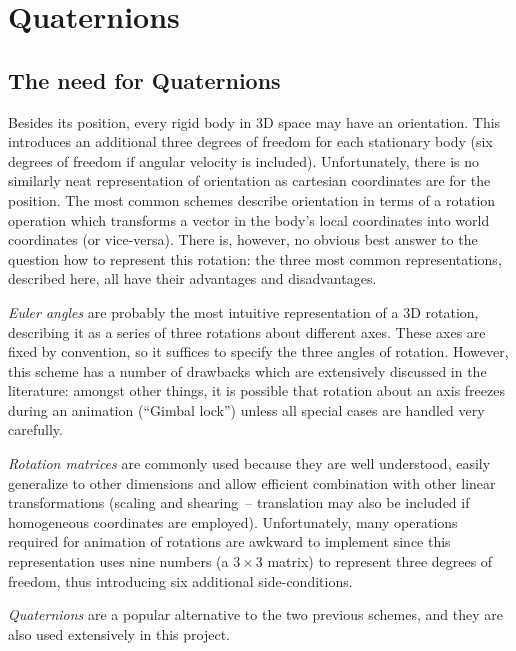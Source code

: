 \section{Quaternions}
\subsection{The need for Quaternions}
Besides its position, every rigid body in 3D space may have an orientation. This introduces an
additional three degrees of freedom for each stationary body (six degrees of freedom if
angular velocity is included). Unfortunately, there is no similarly neat representation of
orientation as cartesian coordinates are for the position. The most common schemes describe
orientation in terms of a rotation operation which transforms a vector in the body's local
coordinates into world coordinates (or vice-versa). There is, however, no obvious best
answer to the question how to represent this rotation: the three most common representations,
described here, all have their advantages and disadvantages.

{\em Euler angles} are probably the most intuitive representation of a 3D rotation, describing
it as a series of three rotations about different axes. These axes are fixed by convention, so it
suffices to specify the three angles of rotation. However, this scheme has a number of drawbacks
which are extensively discussed in the literature: amongst other things, it is possible that
rotation about an axis freezes during an animation (``Gimbal lock'') unless all special cases
are handled very carefully.

{\em Rotation matrices} are commonly used because they are well understood, easily generalize
to other dimensions and allow efficient combination with other linear transformations (scaling
and shearing~-- translation may also be included if homogeneous coordinates are employed).
Unfortunately, many operations required for animation of rotations are awkward to implement
since this representation uses nine numbers (a $3\times3$ matrix) to represent three degrees
of freedom, thus introducing six additional side-conditions.

{\em Quaternions} are a popular alternative to the two previous schemes, and they are also
used extensively in this project.

